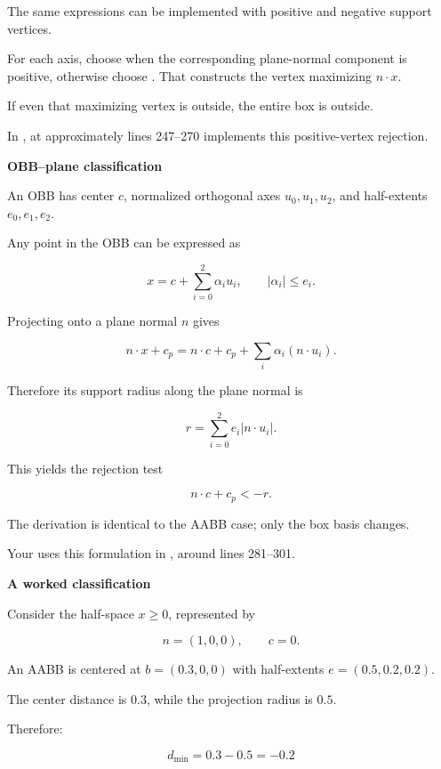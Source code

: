 The same expressions can be implemented with positive and negative support vertices.

For each axis, choose  when the corresponding plane-normal component is positive, otherwise choose . That constructs the vertex maximizing \(n\cdot x\).

If even that maximizing vertex is outside, the entire box is outside.

In ,  at approximately lines 247--270 implements this positive-vertex rejection.

\textbf{OBB--plane classification}

An OBB has center \(c\), normalized orthogonal axes \(u_0,u_1,u_2\), and half-extents \(e_0,e_1,e_2\).

Any point in the OBB can be expressed as

\[
x=c+\sum_{i=0}^{2}\alpha_i u_i, \qquad|\alpha_i|\le e_i.
\]

Projecting onto a plane normal \(n\) gives

\[
n\cdot x+c_p = n\cdot c+c_p+ \sum_i\alpha_i(n\cdot u_i).
\]

Therefore its support radius along the plane normal is

\[
r=\sum_{i=0}^{2}e_i|n\cdot u_i|.
\]

This yields the rejection test

\[
n\cdot c+c_p<-r.
\]

The derivation is identical to the AABB case; only the box basis changes.

Your  uses this formulation in , around lines 281--301.

\textbf{A worked classification}

Consider the half-space \(x\ge0\), represented by

\[
n=(1,0,0),\qquad c=0.
\]

An AABB is centered at \(b=(0.3,0,0)\) with half-extents \(e=(0.5,0.2,0.2)\).

The center distance is \(0.3\), while the projection radius is \(0.5\).

Therefore:

\[
d_{\min}=0.3-0.5=-0.2
\]

